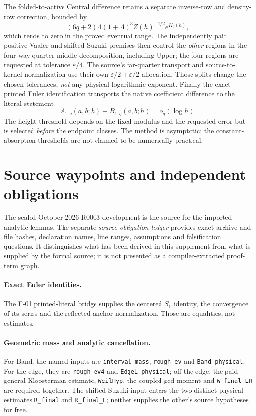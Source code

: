 \documentclass[11pt]{article}
\newcommand{\Lam}{\Lambda}
\theoremstyle{definition}
\theoremstyle{remark}
\newcommand{\1}{\mathbf 1}
\begin{document}
The folded-to-active Central difference retains a separate
inverse-row and density-row correction, bounded by
\[
 (6q+2)\,4(1+\Lam)^3Z(h)^{-1/2}e^{K_0(h)},
\]
which tends to zero in the proved eventual range. The
independently paid positive Vaaler and shifted Suzuki
premises then control the \emph{other} regions in the
four-way quarter-middle decomposition, including Upper;
the four regions are requested at tolerance
$\varepsilon/4$. The source's far-quarter transport
and source-to-kernel normalization use their own
$\varepsilon/2+\varepsilon/2$ allocation. Those splits
change the chosen tolerances, \emph{not} any physical
logarithmic exponent. Finally the exact printed Euler
identification transports the native coefficient difference
to the literal statement
\[
 A_{1,q}(a,b;h)-B_{1,q}(a,b;h)=o_q(\log h).
\]
The height threshold depends on the fixed modulus and the
requested error but is selected \emph{before} the endpoint
classes. The method is asymptotic: the constant-absorption
thresholds are not claimed to be numerically practical.

\section{Source waypoints and independent obligations}
\label{sec:sources}

The sealed October 2026 R0003 development is the source for the
imported analytic lemmas. The separate \emph{source-obligation ledger}
provides exact archive and file hashes, declaration names, line ranges,
assumptions and falsification questions. It distinguishes what has been
derived in this supplement from what is supplied by the formal source;
it is not presented as a compiler-extracted proof-term graph.

\paragraph{Exact Euler identities.}
The F-01 printed-literal bridge supplies the centered $S_1$ identity,
the convergence of its series and the reflected-anchor normalization.
Those are equalities, not estimates.

\paragraph{Geometric mass and analytic cancellation.}
For Band, the named inputs are \texttt{interval\_mass},
\texttt{rough\_ev} and \texttt{Band\_physical}.
For the edge, they are \texttt{rough\_ev4} and
\texttt{EdgeL\_physical}; off the edge, the paid general
Kloosterman estimate, \texttt{WeilHyp}, the coupled gcd moment and
\texttt{W\_final\_LR} are required together. The shifted Suzuki
input enters the two distinct physical estimates
\texttt{R\_final} and \texttt{R\_final\_L}; neither supplies the
other's source hypotheses for free.
\end{document}
